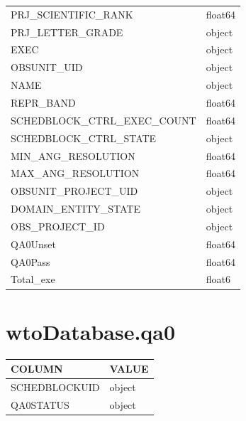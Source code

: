 \documentclass[a4paper,10pt,english]{sphinxmanual}
\begin{document}
\begin{longtable}{|l|l|}
PRJ\_SCIENTIFIC\_RANK
 & 
float64
\\

PRJ\_LETTER\_GRADE
 & 
object
\\

EXEC
 & 
object
\\

OBSUNIT\_UID
 & 
object
\\

NAME
 & 
object
\\

REPR\_BAND
 & 
float64
\\

SCHEDBLOCK\_CTRL\_EXEC\_COUNT
 & 
float64
\\

SCHEDBLOCK\_CTRL\_STATE
 & 
object
\\

MIN\_ANG\_RESOLUTION
 & 
float64
\\

MAX\_ANG\_RESOLUTION
 & 
float64
\\

OBSUNIT\_PROJECT\_UID
 & 
object
\\

DOMAIN\_ENTITY\_STATE
 & 
object
\\

OBS\_PROJECT\_ID
 & 
object
\\

QA0Unset
 & 
float64
\\

QA0Pass
 & 
float64
\\

Total\_exe
 & 
float6
\\
\hline\end{longtable}



\section{wtoDatabase.qa0}
\label{wtodata:wtodatabase-qa0}
\begin{tabulary}{\linewidth}{|L|L|}
\hline
\textsf{\relax 
COLUMN
} & \textsf{\relax 
VALUE
}\\
\hline
SCHEDBLOCKUID
 & 
object
\\

QA0STATUS
 & 
object
\\
\hline\end{tabulary}
\end{document}
